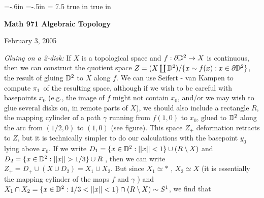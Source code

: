

\overfullrule=0pt
\parindent=0pt

\nopagenumbers



\voffset=-.6in
\hoffset=-.5in
\hsize = 7.5 true in
 true in




\loadmsbm



\def\ctln{\centerline}
\def\u{\underbar}
\def\ssk{\smallskip}
\def\msk{\medskip}
\def\bsk{\bigskip}
\def\hsk{\hskip.1in}
\def\hhsk{\hskip.2in}
\def\dsl{\displaystyle}
\def\hskp{\hskip1.5in}

\def\lra{$\Leftrightarrow$ }
\def\ra{\rightarrow}
\def\mpto{\logmapsto}
\def\pu{\pi_1}
\def\mpu{$\pi_1$}
\def\sig{\Sigma}
\def\msig{$\Sigma$}
\def\ep{\epsilon}
\def\sset{\subseteq}
\def\del{\partial}




\ctln{\bf Math 971 Algebraic Topology}

\ssk

\ctln{February 3, 2005}

\msk


{\it Gluing on a 2-disk:} If $X$ is a topological 
space and $f:\del {\Bbb D}^2\ra X$ is continuous, then we
can construct the quotient space $Z=(X\coprod 
{\Bbb D}^2)/\{x\sim f(x) : x\in\del{\Bbb D}^2\}$,
the result of gluing ${\Bbb D}^2$ to $X$ along $f$. 
We can use Seifert - van Kampen to compute \mpu\ 
of the resulting space, although if we
wish to be careful with basepoints $x_0$ 
(e.g., the image of $f$ might not contain $x_0$, and/or we
may wish to glue several disks on, in remote parts of $X$),
we should also include a rectangle $R$, the mapping 
cylinder of a path $\gamma$ running from 
$f(1,0)$ to $x_0$, glued to 
${\Bbb D}^2$ along the arc from $(1/2,0)$ to $(1,0)$ (see figure). 
This space $Z_+$ deformation retracts to $Z$, but it
is technically simpler to do our calculations 
with the basepoint $y_0$ lying above $x_0$.
If we write $D_1 = \{x\in {\Bbb D}^2 : ||x||<1\}\cup(R\setminus X)$ 
and $D_2 = \{x\in {\Bbb D}^2 : ||x||>1/3\}\cup R$ , 
then we can write $Z_+=D_+\cup(X\cup D_2) = X_1\cup X_2$.
But since $X_1\simeq *$ , $X_2\simeq X$ 
(it is essentially the mapping cylinder of 
the maps $f$ and $\gamma$ )
and $X_1\cap X_2 = \{x\in {\Bbb D}^2 : 
1/3<||x||<1\}\cap(R\setminus X)\sim S^1$, we find that 

